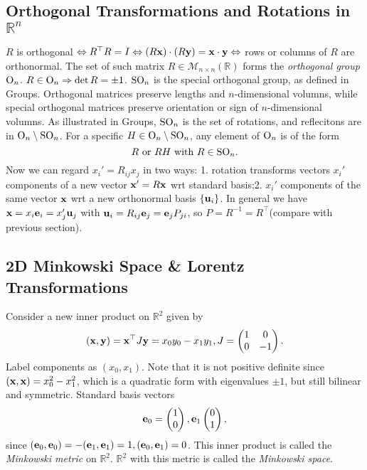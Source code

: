 \documentclass[10pt]{article}
\begin{document}
    \subsection{Orthogonal Transformations and Rotations in $ \mathbb{R}^{n} $}
    $ R $ is orthogonal $ \Leftrightarrow R^\top R=I \Leftrightarrow (R{\bf x})\cdot (R{\bf y})={\bf x} \cdot {\bf y} \Leftrightarrow  $ rows or columns of $R$ are orthonormal. The set of such matrix $ R\in \mathcal{M}_{n\times n}(\mathbb{R}) $ forms the \textit{orthogonal group} $ \mathrm{O}_n $. $ R\in \mathrm{O}_n \Rightarrow \det R=\pm 1 $. $ \mathrm{SO}_n $ is the special orthogonal group, as defined in Groups. Orthogonal matrices preserve lengths and $n$-dimensional volumns, while special orthogonal matrices preserve orientation or sign of $n$-dimensional volumns. As illustrated in Groups, $\mathrm{SO}_n$ is the set of rotations, and reflecitons are in $ \mathrm{O}_n \setminus \mathrm{SO}_n $. For a specific $H\in \mathrm{O}_n \setminus \mathrm{SO}_n$, any element of $\mathrm{O}_n$ is of the form
    \[
        R \text{ or } RH \text{ with }R\in \mathrm{SO}_n.
    \] 
    Now we can regard $ x_i'=R_{ij}x_j $ in two ways: 1. rotation transforms vectors $x_i'$ components of a new vector $ {\bf x}'=R{\bf x} $ wrt standard basis;2. $ x_i' $ components of the same vector ${\bf x}$ wrt a new orthonormal basis $ \{{\bf u}_i\} $. In general we have $ {\bf x}=x_i{\bf e}_i=x_j'{\bf u}_j $ with $ {\bf u}_i=R_{ij}{\bf e}_j={\bf e}_jP_{ji} $, so $ P=R^{-1}=R^\top $(compare with previous section).
    \subsection{2D Minkowski Space \& Lorentz Transformations}
    Consider a new inner product on $ \mathbb{R}^{2} $ given by 
    \[
        ({\bf x},{\bf y})={\bf x}^\top J {\bf y}=x_0y_0-x_1y_1,J=\begin{pmatrix}
            1&0\\
            0&-1
        \end{pmatrix}.
    \]
    Label components as $ (x_0,x_1) $. Note that it is not positive definite since $ ({\bf x},{\bf x})=x_0^2-x_1^2 $, which is a quadratic form with eigenvalues $ \pm 1 $, but still bilinear and symmetric. Standard basis vectors
    \[
        {\bf e}_0=\begin{pmatrix}
            1\\0
        \end{pmatrix},{\bf e}_1\begin{pmatrix}
            0\\1
        \end{pmatrix},
    \]
    since $ ({\bf e}_0,{\bf e}_0)=-({\bf e}_1,{\bf e}_1)=1, ({\bf e}_0,{\bf e}_1)=0 $. This inner product is called the \textit{Minkowski metric }on $ \mathbb{R}^{2} $. $ \mathbb{R}^{2} $ with this metric is called the \textit{Minkowski space}.
\end{document}
